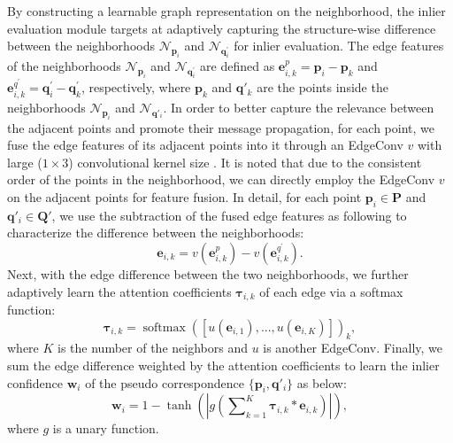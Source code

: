 \documentclass[letterpaper]{article} %
\begin{document}
	By constructing a learnable graph representation on the neighborhood, the inlier evaluation module targets at adaptively capturing the structure-wise difference between the neighborhoods $\mathcal{N}_{\mathbf{p}_i}$ and $\mathcal{N}_{\mathbf{q}^{\prime}_i}$ for inlier evaluation.
	The edge features of the neighborhoods $\mathcal{N}_{\mathbf{p}_i}$ and $\mathcal{N}_{\mathbf{q}^{\prime}_i}$ are defined as $\mathbf{e}^{p}_{i,k} = \mathbf{p}_i - \mathbf{p}_k$ and $\mathbf{e}^{q^{\prime}}_{i,k} = \mathbf{q}^{\prime}_i - \mathbf{q}^{\prime}_k$, respectively, where $\mathbf{p}_k$ and $\mathbf{q}'_k$ are the points inside the neighborhoods $\mathcal{N}_{\mathbf{p}_i}$ and $\mathcal{N}_{\mathbf{q}'_i}$.
	In order to better capture the relevance between the adjacent points and promote their message propagation, for each point, we fuse the edge features of its adjacent points into it through an EdgeConv $v$ with large ($1\times 3$) convolutional kernel size \cite{wang2019dynamic}.
	It is noted that due to the consistent order of the points in the neighborhood, we can directly employ the EdgeConv $v$ on the adjacent points for feature fusion.
	In detail, for each point $\mathbf{p}_i\in \mathbf{P}$ and $\mathbf{q}'_i\in\mathbf{Q}'$, we use the subtraction of the fused edge features as following to characterize the difference between the neighborhoods:
	\begin{equation}\label{e0}
	\mathbf{e}_{i,k} = v \left(\mathbf{e}^{p}_{i,k}\right) - v \left(\mathbf{e}^{q^{\prime}}_{i,k}\right).
	\end{equation}
	Next, with the edge difference between the two neighborhoods, we further adaptively learn the attention coefficients $\bm{\tau}_{i,k}$ of each edge via a softmax function:
	\begin{equation}\label{eq8}
	\bm{\tau}_{i,k} = \operatorname{softmax} \left(\left[u\left(\mathbf{e}_{i,1}\right),...,u\left(\mathbf{e}_{i,K}\right)\right]\right)_k,
	\end{equation}
	where $K$ is the number of the neighbors and $u$ is another EdgeConv.
	Finally, we sum the edge difference weighted by the attention coefficients to learn the inlier confidence $\mathbf{w}_{i}$ of the pseudo correspondence $\{\mathbf{p}_i,\mathbf{q}'_i\}$ as below:
	\begin{equation}\label{eq9}
	\mathbf{w}_{i} = 1 - \operatorname{tanh}\left(\left|g \left(\sum\nolimits_{k=1}^{K}\mathbf{\tau}_{i,k} * \mathbf{e}_{i,k}\right) \right|\right),
	\end{equation}
	where $g$ is a unary function.
\end{document}
